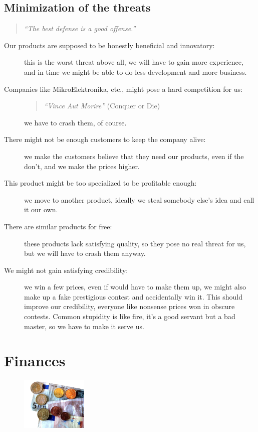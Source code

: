 \documentclass[a4paper,twoside,15pt]{book}
\begin{document}
        \subsection{Minimization of the threats}
            \begin{quote}
                \textit{``The best defense is a good offense.''}
            \end{quote}
             \begin{description}
                \item[Our products are supposed to be honestly beneficial and innovatory:]
                    this is the worst threat above all, we will have to gain more experience, and in time we might be able to do less development and more business.
                \item[Companies like MikroElektronika, etc., might pose a hard competition for us:]
                    \begin{quote}
                        \textit{``Vince Aut Morire''} \small{(Conquer or Die)}
                    \end{quote}
                    we have to crash them, of course.
                \item[There might not be enough customers to keep the company alive:]
                    we make the customers believe that they need our products, even if the don't, and we make the prices higher.
                \item[This product might be too specialized to be profitable enough:]
                    we move to another product, ideally we steal somebody else's idea and call it our own.
                \item[There are similar products for free:]
                    these products lack satisfying quality, so they pose no real threat for us, but we will have to crash them anyway.
                \item[We might not gain satisfying credibility:]
                    we win a few prices, even if would have to make them up, we might also make up a fake prestigious contest and accidentally win it. This should improve our credibility, everyone like nonsense prices won in obscure contests. Common stupidity is like fire, it's a good servant but a bad master, so we have to make it serve us.
             \end{description}

    \section{Finances}
        \begin{figure}
            \centering{}
            \includegraphics[width=90pt]{images/Euromoenterogsedler.jpg}
        \end{figure}
\end{document}
